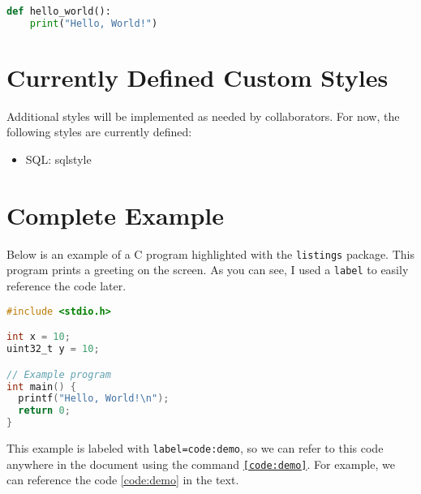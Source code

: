 
\begin{lstlisting}[language=Python]
    def hello_world():
    print("Hello, World!")
\end{lstlisting}

\section{Currently Defined Custom Styles}

Additional styles will be implemented as needed by collaborators. For now, the following styles are currently defined:

\begin{itemize}
    \item SQL: sqlstyle
\end{itemize}

\section{Complete Example}

Below is an example of a C program highlighted with the \texttt{listings} package. This program prints a greeting on the screen. As you can see, I used a \texttt{label} to easily reference the code later.

\begin{lstlisting}[language=C, style=hkn, caption={Demo}, label=code:demo]
#include <stdio.h>

int x = 10;
uint32_t y = 10;

// Example program
int main() {
  printf("Hello, World!\n");
  return 0;
}
\end{lstlisting}

This example is labeled with \texttt{label=code:demo}, so we can refer to this code anywhere in the document using the command \texttt{\ref{code:demo}}. For example, we can reference the code \ref{code:demo} in the text.
